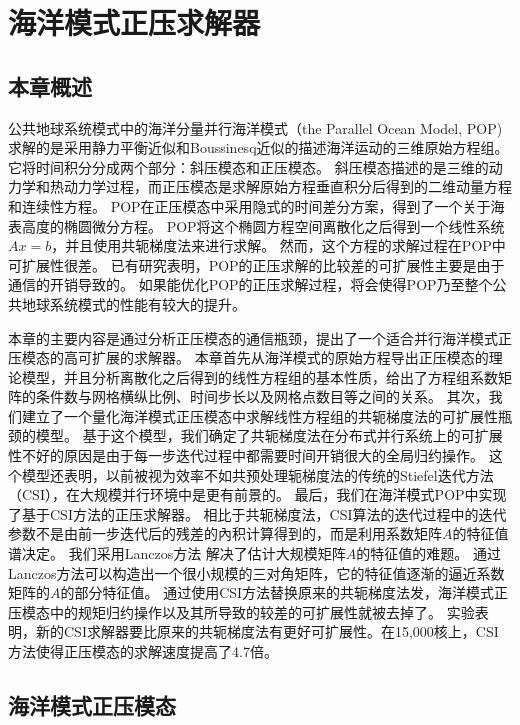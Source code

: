 \chapter{海洋模式正压求解器}
\label{cha:barosSolver}

\section{本章概述}

公共地球系统模式中的海洋分量并行海洋模式（the Parallel Ocean Model, POP) 求解的是采用静力平衡近似和Boussinesq近似的描述海洋运动的三维原始方程组。 
它将时间积分分成两个部分：斜压模态和正压模态。 
斜压模态描述的是三维的动力学和热动力学过程，而正压模态是求解原始方程垂直积分后得到的二维动量方程和连续性方程。
POP在正压模态中采用隐式的时间差分方案，得到了一个关于海表高度的椭圆微分方程。 
POP将这个椭圆方程空间离散化之后得到一个线性系统$Ax=b$，并且使用共轭梯度法来进行求解。
然而，这个方程的求解过程在POP中可扩展性很差。
已有研究表明，POP的正压求解的比较差的可扩展性主要是由于通信的开销导致的\cite{Worley:2011:PCE:2063384.2063457}。 
如果能优化POP的正压求解过程，将会使得POP乃至整个公共地球系统模式的性能有较大的提升\cite{dennis2012computational}。 


本章的主要内容是通过分析正压模态的通信瓶颈，提出了一个适合并行海洋模式正压模态的高可扩展的求解器。 
本章首先从海洋模式的原始方程导出正压模态的理论模型，并且分析离散化之后得到的线性方程组的基本性质，给出了方程组系数矩阵的条件数与网格横纵比例、时间步长以及网格点数目等之间的关系。 
其次，我们建立了一个量化海洋模式正压模态中求解线性方程组的共轭梯度法的可扩展性瓶颈的模型。
基于这个模型，我们确定了共轭梯度法在分布式并行系统上的可扩展性不好的原因是由于每一步迭代过程中都需要时间开销很大的全局归约操作。 这个模型还表明，以前被视为效率不如共预处理轭梯度法的传统的Stiefel迭代方法（CSI），在大规模并行环境中是更有前景的。
最后，我们在海洋模式POP中实现了基于CSI方法的正压求解器。 相比于共轭梯度法，CSI算法的迭代过程中的迭代参数不是由前一步迭代后的残差的內积计算得到的，而是利用系数矩阵$A$的特征值谱决定。 
我们采用Lanczos方法 解决了估计大规模矩阵$A$的特征值的难题。 
通过Lanczos方法可以构造出一个很小规模的三对角矩阵，它的特征值逐渐的逼近系数矩阵的$A$的部分特征值。 
通过使用CSI方法替换原来的共轭梯度法发，海洋模式正压模态中的规矩归约操作以及其所导致的较差的可扩展性就被去掉了。 
实验表明，新的CSI求解器要比原来的共轭梯度法有更好可扩展性。在15,000核上，CSI方法使得正压模态的求解速度提高了4.7倍。





\section{海洋模式正压模态}
\label{solver:baro}

